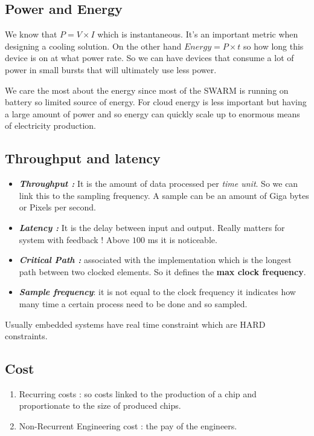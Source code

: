 \documentclass{report}
\begin{document}
\subsection{Power and Energy}

We know that $P = V \times I$ which is instantaneous. It's an important metric when designing a cooling solution.
On the other hand $Energy = P \times t$ so how long this device is on at what power rate. So we can have devices that consume a lot of power in small bursts that will ultimately use less power.

We care the most about the energy since most of the SWARM is running on battery so limited source of energy. For cloud energy is less important but having a large amount of power and so energy can quickly scale up to enormous means of electricity production.

\subsection{Throughput and latency}

\begin{itemize}
    \item \textbf{\textit{Throughput :}} It is the amount of data processed per \textit{time unit}. So we can link this to the sampling frequency. A sample can be an amount of Giga bytes or Pixels per second.
    \item \textit{\textbf{Latency :}} It is the delay between input and output. Really matters for system with feedback ! Above $100$ ms it is noticeable.
    \item \textit{\textbf{Critical Path :}} associated with the implementation which is the longest path between two clocked elements. So it defines the \textbf{max clock frequency}.
    \item \textit{\textbf{Sample frequency}}: it is not equal to the clock frequency it indicates how many time a certain process need to be done and so sampled.
\end{itemize}

Usually embedded systems have real time constraint which are HARD constraints.

\subsection{Cost}

\begin{enumerate}
    \item Recurring costs : so costs linked to the production of a chip and proportionate to the size of produced chips.
    \item Non-Recurrent Engineering cost : the pay of the engineers.
\end{enumerate}
\end{document}
